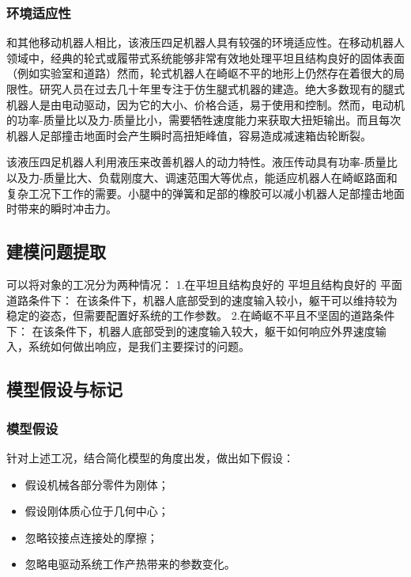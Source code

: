 \subsubsection{环境适应性}

和其他移动机器人相比，该液压四足机器人具有较强的环境适应性。在移动机器人领域中，经典的轮式或履带式系统能够非常有效地处理平坦且结构良好的固体表面（例如实验室和道路）然而，轮式机器人在崎岖不平的地形上仍然存在着很大的局限性。研究人员在过去几十年里专注于仿生腿式机器的建造。绝大多数现有的腿式机器人是由电动驱动，因为它的大小、价格合适，易于使用和控制。然而，电动机的功率-质量比以及力-质量比小，需要牺牲速度能力来获取大扭矩输出。而且每次机器人足部撞击地面时会产生瞬时高扭矩峰值，容易造成减速箱齿轮断裂。 

该液压四足机器人利用液压来改善机器人的动力特性。液压传动具有功率-质量比以及力-质量比大、负载刚度大、调速范围大等优点，能适应机器人在崎岖路面和复杂工况下工作的需要。小腿中的弹簧和足部的橡胶可以减小机器人足部撞击地面时带来的瞬时冲击力。

\subsection{建模问题提取}

可以将对象的工况分为两种情况：
1.在平坦且结构良好的 平坦且结构良好的 平面道路条件下：
在该条件下，机器人底部受到的速度输入较小，躯干可以维持较为稳定的姿态，但需要配置好系统的工作参数。 
2.在崎岖不平且不坚固的道路条件下：
在该条件下，机器人底部受到的速度输入较大，躯干如何响应外界速度输入，系统如何做出响应，是我们主要探讨的问题。 

\subsection{模型假设与标记}

\subsubsection{模型假设}

针对上述工况，结合简化模型的角度出发，做出如下假设：

\begin{itemize}
	
	\item 假设机械各部分零件为刚体；
	
	\item 假设刚体质心位于几何中心；
	
	\item 忽略铰接点连接处的摩擦；
	
	\item 忽略电驱动系统工作产热带来的参数变化。
	
\end{itemize}

